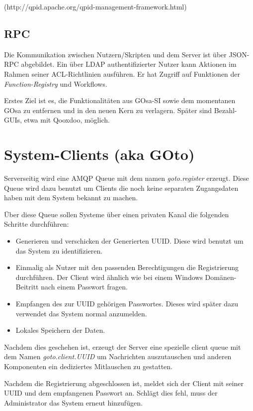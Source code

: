 (http://qpid.apache.org/qpid-management-framework.html)

\subsection{RPC}

Die Kommunikation zwischen Nutzern/Skripten und dem Server ist über JSON-RPC
abgebildet. Ein über LDAP authentifizierter Nutzer kann Aktionen im Rahmen
seiner ACL-Richtlinien ausführen. Er hat Zugriff auf Funktionen der
\textit{Function-Registry} und Workflows.

Erstes Ziel ist es, die Funktionalitäten aus GOsa-SI sowie dem momentanen
GOsa zu entfernen und in den neuen Kern zu verlagern. Später sind
Bezahl-GUIs, etwa mit Qooxdoo, möglich.


\section{System-Clients (aka GOto)}

Serverseitig wird eine AMQP Queue mit dem namen \textit{goto.register}
erzeugt. Diese Queue wird dazu benutzt um Clients die noch keine
separaten Zugangsdaten haben mit dem System bekannt zu machen.

Über diese Queue sollen Systeme über einen privaten Kanal die folgenden
Schritte durchführen:

\begin{itemize}
  \item Generieren und verschicken der Generierten UUID. Diese wird benutzt um
        das System zu identifizieren.
  \item Einmalig als Nutzer mit den passenden Berechtigungen die Registrierung
        durch\-füh\-ren. Der Client wird ähnlich wie bei einem Windows
        Domänen-Beitritt nach einem Passwort fragen.
  \item Empfangen des zur UUID gehörigen Passwortes. Dieses wird später dazu
        verwendet das System normal anzumelden.
  \item Lokales Speichern der Daten.
\end{itemize}
    
Nachdem dies geschehen ist, erzeugt der Server eine spezielle client queue mit
dem Namen \textit{goto.client.UUID} um Nachrichten auszutauschen und anderen
Komponenten ein dediziertes Mitlauschen zu gestatten.

Nachdem die Registrierung abgeschlossen ist, meldet sich der Client mit seiner
UUID und dem empfangenen Passwort an. Schlägt dies fehl, muss der Administrator
das System erneut hinzufügen.

